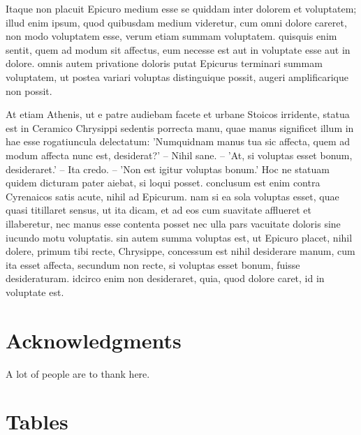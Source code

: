 \documentclass[a4paper,12pt]{article}
\begin{document}
Itaque non placuit Epicuro medium esse se quiddam inter dolorem et voluptatem; illud enim
ipsum, quod quibusdam medium videretur, cum omni dolore careret, non modo voluptatem esse,
verum etiam summam voluptatem. quisquis enim sentit, quem ad modum sit affectus, eum
necesse est aut in voluptate esse aut in dolore. omnis autem privatione doloris putat
Epicurus terminari summam voluptatem, ut postea variari voluptas distinguique possit,
augeri amplificarique non possit.

At etiam Athenis, ut e patre audiebam facete et urbane Stoicos irridente, statua est in
Ceramico Chrysippi sedentis porrecta manu, quae manus significet illum in hae esse
rogatiuncula delectatum: 'Numquidnam manus tua sic affecta, quem ad modum affecta nunc
est, desiderat?' -- Nihil sane. -- 'At, si voluptas esset bonum, desideraret.' -- Ita
credo. -- 'Non est igitur voluptas bonum.' Hoc ne statuam quidem dicturam pater aiebat, si
loqui posset. conclusum est enim contra Cyrenaicos satis acute, nihil ad Epicurum. nam si
ea sola voluptas esset, quae quasi titillaret sensus, ut ita dicam, et ad eos cum
suavitate afflueret et illaberetur, nec manus esse contenta posset nec ulla pars vacuitate
doloris sine iucundo motu voluptatis. sin autem summa voluptas est, ut Epicuro placet,
nihil dolere, primum tibi recte, Chrysippe, concessum est nihil desiderare manum, cum ita
esset affecta, secundum non recte, si voluptas esset bonum, fuisse desideraturam. idcirco
enim non desideraret, quia, quod dolore caret, id in voluptate est.


\section*{Acknowledgments}

A lot of people are to thank here.


\newpage





\newpage


\section*{Tables}


\end{document}
